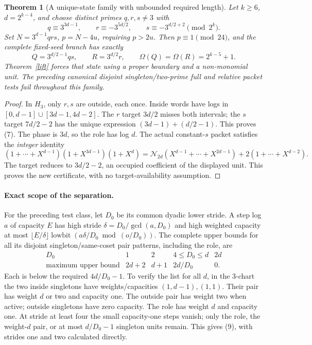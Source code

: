 \documentclass[10pt,a4paper]{article}
\newtheorem{theorem}{Theorem}
\begin{document}
\begin{theorem}[A unique-state family with unbounded required length]
Let $k\ge6$, $d=2^{k-4}$, and choose distinct primes $q,r,s\ne3$ with
\[
 q\equiv3^{3d-1},\qquad r\equiv-3^{5d/2},\qquad
 s\equiv-3^{d/2+2}\pmod{2^k}.
\]
Set $N=3^{d-1}qrs$, $p=N-4u$, requiring $p>2u$. Then $p\equiv1\pmod{24}$,
and the complete fixed-seed branch has exactly
\[
 \boxed{Q=3^{d/2-1}qs,
 \qquad R=3^{d/2}r,
 \qquad \Omega(Q)=\Omega(R)=2^{k-5}+1.}                     \tag{7}
\]
Theorem~\ref{lift} forces that state using a proper boundary and a non-monomial
unit. The preceding canonical disjoint singleton/two-prime full and relative
packet tests fail throughout this family.
\end{theorem}
\begin{proof}
In $H_3$, only $r,s$ are outside, each once. Inside words have logs in
$[0,d-1]\cup[3d-1,4d-2]$. The $r$ target $3d/2$ misses both intervals;
the $s$ target $7d/2-2$ has the unique expression $(3d-1)+(d/2-1)$.
This proves (7). The phase is $3d$, so the role has log $d$. The actual
constant-$s$ packet satisfies the \emph{integer} identity
\[
 (1+\cdots+X^{d-1})(1+X^{3d-1})(1+X^d)
 =\mathcal N_{2d}(X^{d-1}+\cdots+X^{2d-1})+2(1+\cdots+X^{d-2}). \tag{8}
\]
The target reduces to $3d/2-2$, an occupied coefficient of the displayed unit.
This proves the new certificate, with no target-availability assumption.
\end{proof}

\newpage
\paragraph{Exact scope of the separation.}
For the preceding test class, let $D_0$ be its common dyadic lower stride.
A step log $a$ of capacity $E$ has high stride
$\delta=D_0/\gcd(a,D_0)$ and high weighted capacity at most
$\lfloor E/\delta\rfloor\operatorname{lowbit}(a\delta/D_0\bmod(o/D_0))$.
The complete upper bounds for all its disjoint singleton/same-coset pair
patterns, including the role, are
\[
\begin{array}{c|cccc}
D_0&1&2&4\le D_0\le d&2d\\\hline
\text{maximum upper bound}&2d+2&d+1&2d/D_0&0.
\end{array}                                                 \tag{9}
\]
Each is below the required $4d/D_0-1$. To verify the list for all $d$, in the
$3$-chart the two inside singletons have weights/capacities $(1,d-1),(1,1)$.
Their pair has weight $d$ or two and capacity one. The outside pair has weight
two when active; outside singletons have zero capacity. The role has weight
$d$ and capacity one. At stride at least four the small capacity-one steps
vanish; only the role, the weight-$d$ pair, or at most $d/D_0-1$ singleton
units remain. This gives (9), with strides one and two calculated directly.
\end{document}
